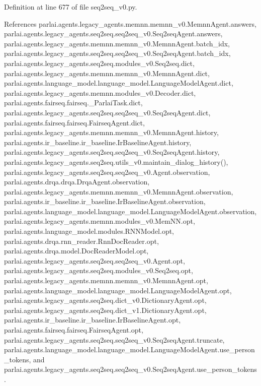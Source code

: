 Definition at line 677 of file seq2seq\+\_\+v0.\+py.



References parlai.\+agents.\+legacy\+\_\+agents.\+memnn.\+memnn\+\_\+v0.\+Memnn\+Agent.\+answers, parlai.\+agents.\+legacy\+\_\+agents.\+seq2seq.\+seq2seq\+\_\+v0.\+Seq2seq\+Agent.\+answers, parlai.\+agents.\+legacy\+\_\+agents.\+memnn.\+memnn\+\_\+v0.\+Memnn\+Agent.\+batch\+\_\+idx, parlai.\+agents.\+legacy\+\_\+agents.\+seq2seq.\+seq2seq\+\_\+v0.\+Seq2seq\+Agent.\+batch\+\_\+idx, parlai.\+agents.\+legacy\+\_\+agents.\+seq2seq.\+modules\+\_\+v0.\+Seq2seq.\+dict, parlai.\+agents.\+legacy\+\_\+agents.\+memnn.\+memnn\+\_\+v0.\+Memnn\+Agent.\+dict, parlai.\+agents.\+language\+\_\+model.\+language\+\_\+model.\+Language\+Model\+Agent.\+dict, parlai.\+agents.\+legacy\+\_\+agents.\+memnn.\+modules\+\_\+v0.\+Decoder.\+dict, parlai.\+agents.\+fairseq.\+fairseq.\+\_\+\+Parlai\+Task.\+dict, parlai.\+agents.\+legacy\+\_\+agents.\+seq2seq.\+seq2seq\+\_\+v0.\+Seq2seq\+Agent.\+dict, parlai.\+agents.\+fairseq.\+fairseq.\+Fairseq\+Agent.\+dict, parlai.\+agents.\+legacy\+\_\+agents.\+memnn.\+memnn\+\_\+v0.\+Memnn\+Agent.\+history, parlai.\+agents.\+ir\+\_\+baseline.\+ir\+\_\+baseline.\+Ir\+Baseline\+Agent.\+history, parlai.\+agents.\+legacy\+\_\+agents.\+seq2seq.\+seq2seq\+\_\+v0.\+Seq2seq\+Agent.\+history, parlai.\+agents.\+legacy\+\_\+agents.\+seq2seq.\+utils\+\_\+v0.\+maintain\+\_\+dialog\+\_\+history(), parlai.\+agents.\+legacy\+\_\+agents.\+seq2seq.\+seq2seq\+\_\+v0.\+Agent.\+observation, parlai.\+agents.\+drqa.\+drqa.\+Drqa\+Agent.\+observation, parlai.\+agents.\+legacy\+\_\+agents.\+memnn.\+memnn\+\_\+v0.\+Memnn\+Agent.\+observation, parlai.\+agents.\+ir\+\_\+baseline.\+ir\+\_\+baseline.\+Ir\+Baseline\+Agent.\+observation, parlai.\+agents.\+language\+\_\+model.\+language\+\_\+model.\+Language\+Model\+Agent.\+observation, parlai.\+agents.\+legacy\+\_\+agents.\+memnn.\+modules\+\_\+v0.\+Mem\+N\+N.\+opt, parlai.\+agents.\+language\+\_\+model.\+modules.\+R\+N\+N\+Model.\+opt, parlai.\+agents.\+drqa.\+rnn\+\_\+reader.\+Rnn\+Doc\+Reader.\+opt, parlai.\+agents.\+drqa.\+model.\+Doc\+Reader\+Model.\+opt, parlai.\+agents.\+legacy\+\_\+agents.\+seq2seq.\+seq2seq\+\_\+v0.\+Agent.\+opt, parlai.\+agents.\+legacy\+\_\+agents.\+seq2seq.\+modules\+\_\+v0.\+Seq2seq.\+opt, parlai.\+agents.\+legacy\+\_\+agents.\+memnn.\+memnn\+\_\+v0.\+Memnn\+Agent.\+opt, parlai.\+agents.\+language\+\_\+model.\+language\+\_\+model.\+Language\+Model\+Agent.\+opt, parlai.\+agents.\+legacy\+\_\+agents.\+seq2seq.\+dict\+\_\+v0.\+Dictionary\+Agent.\+opt, parlai.\+agents.\+legacy\+\_\+agents.\+seq2seq.\+dict\+\_\+v1.\+Dictionary\+Agent.\+opt, parlai.\+agents.\+ir\+\_\+baseline.\+ir\+\_\+baseline.\+Ir\+Baseline\+Agent.\+opt, parlai.\+agents.\+fairseq.\+fairseq.\+Fairseq\+Agent.\+opt, parlai.\+agents.\+legacy\+\_\+agents.\+seq2seq.\+seq2seq\+\_\+v0.\+Seq2seq\+Agent.\+truncate, parlai.\+agents.\+language\+\_\+model.\+language\+\_\+model.\+Language\+Model\+Agent.\+use\+\_\+person\+\_\+tokens, and parlai.\+agents.\+legacy\+\_\+agents.\+seq2seq.\+seq2seq\+\_\+v0.\+Seq2seq\+Agent.\+use\+\_\+person\+\_\+tokens.



